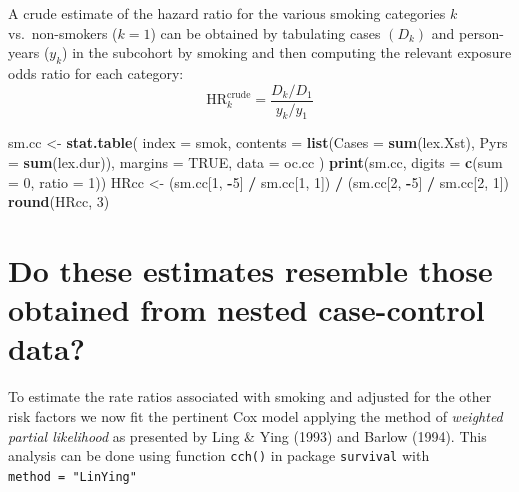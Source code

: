 \documentclass[
]{book}
\newenvironment{Shaded}{\begin{snugshade}}{\end{snugshade}}
\newcommand{\AttributeTok}[1]{\textcolor[rgb]{0.13,0.29,0.53}{#1}}
\newcommand{\ConstantTok}[1]{\textcolor[rgb]{0.56,0.35,0.01}{#1}}
\newcommand{\DecValTok}[1]{\textcolor[rgb]{0.00,0.00,0.81}{#1}}
\newcommand{\FunctionTok}[1]{\textcolor[rgb]{0.13,0.29,0.53}{\textbf{#1}}}
\newcommand{\NormalTok}[1]{#1}
\newcommand{\OtherTok}[1]{\textcolor[rgb]{0.56,0.35,0.01}{#1}}
\newcommand{\SpecialCharTok}[1]{\textcolor[rgb]{0.81,0.36,0.00}{\textbf{#1}}}
\begin{document}
A crude estimate of the hazard ratio for the various smoking categories \(k\)
vs.~non-smokers (\(k=1\)) can be obtained by tabulating cases \((D_k)\) and person-years (\(y_k\))
in the subcohort by smoking and then computing the
relevant exposure odds ratio for each category:
\[ \text{HR}_k ^{\text{crude}} = \frac{D_k/D_1}{y_k/y_1} \]

\begin{Shaded}
\begin{Highlighting}[]
\NormalTok{sm.cc }\OtherTok{\textless{}{-}} \FunctionTok{stat.table}\NormalTok{(}
  \AttributeTok{index =}\NormalTok{ smok,}
  \AttributeTok{contents =} \FunctionTok{list}\NormalTok{(}\AttributeTok{Cases =} \FunctionTok{sum}\NormalTok{(lex.Xst), }\AttributeTok{Pyrs =} \FunctionTok{sum}\NormalTok{(lex.dur)),}
  \AttributeTok{margins =} \ConstantTok{TRUE}\NormalTok{, }
  \AttributeTok{data =}\NormalTok{ oc.cc}
\NormalTok{)}
\FunctionTok{print}\NormalTok{(sm.cc, }\AttributeTok{digits =} \FunctionTok{c}\NormalTok{(}\AttributeTok{sum =} \DecValTok{0}\NormalTok{, }\AttributeTok{ratio =} \DecValTok{1}\NormalTok{))}
\NormalTok{HRcc }\OtherTok{\textless{}{-}} 
\NormalTok{  (sm.cc[}\DecValTok{1}\NormalTok{, }\SpecialCharTok{{-}}\DecValTok{5}\NormalTok{] }\SpecialCharTok{/}\NormalTok{ sm.cc[}\DecValTok{1}\NormalTok{, }\DecValTok{1}\NormalTok{]) }\SpecialCharTok{/}\NormalTok{ (sm.cc[}\DecValTok{2}\NormalTok{, }\SpecialCharTok{{-}}\DecValTok{5}\NormalTok{] }\SpecialCharTok{/}\NormalTok{ sm.cc[}\DecValTok{2}\NormalTok{, }\DecValTok{1}\NormalTok{])}
\FunctionTok{round}\NormalTok{(HRcc, }\DecValTok{3}\NormalTok{)}
\end{Highlighting}
\end{Shaded}

\section{Do these estimates resemble those obtained from nested case-control data?}\label{do-these-estimates-resemble-those-obtained-from-nested-case-control-data}

To estimate the rate ratios associated with smoking and adjusted for the
other risk factors we now fit the pertinent Cox model
applying the method of \emph{weighted partial likelihood} as
presented by Ling \& Ying (1993) and Barlow (1994).
This analysis can be done using function \texttt{cch()}
in package \texttt{survival} with \texttt{method\ =\ "LinYing"}
\end{document}

